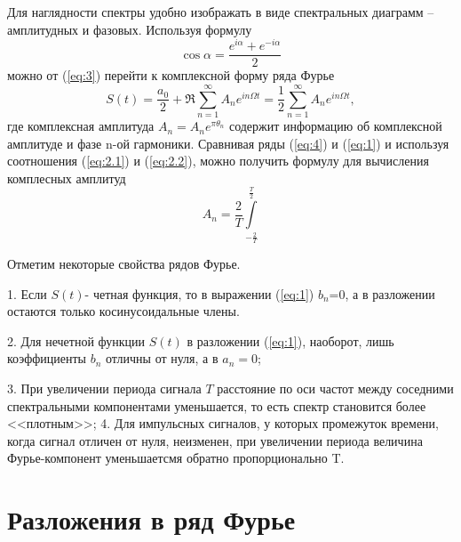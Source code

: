  Для наглядности спектры удобно изображать в виде спектральных диаграмм -- амплитудных и фазовых.
 Используя формулу
 \begin{equation}
 	\cos\alpha=\frac{e^{i\alpha}+e^{-i\alpha}}{2}
 \end{equation}
 можно от (\ref{eq:3}) перейти к комплексной форму ряда Фурье
 \begin{equation}
 	\label{eq:4}
 	S(t)=\frac{a_0}{2}+\Re\sum_{n=1}^{\infty}A_ne^{in\Omega t}=\frac{1}{2}\sum_{n=1}^{\infty}A_ne^{in\Omega t}, %
 \end{equation}
 где комплексная амплитуда $A_n=A_ne^{\pi\theta_n}$ содержит информацию об комплексной амплитуде и фазе n-ой гармоники. Сравнивая ряды (\ref{eq:4}) и (\ref{eq:1}) и используя соотношения (\ref{eq:2.1}) и (\ref{eq:2.2}), можно получить формулу для вычисления комплесных амплитуд
 \begin{equation}
 	A_n=\frac{2}{T}\int\limits_{-\frac{2}{T}}^{\frac{T}{2}}
 \end{equation}

 Отметим некоторые свойства рядов Фурье.

 1. Если $S(t)$- четная функция, то в выражении (\ref{eq:1}) $b_n$=0, а в разложении остаются только косинусоидальные члены.

 2. Для нечетной функции $S(t)$ в разложении (\ref{eq:1}), наоборот, лишь коэффициенты $b_n$ отличны от нуля, а в $a_n=0$;

 3. При увеличении периода сигнала $T$ расстояние по оси частот между соседними спектральными компонентами уменьшается, то есть спектр становится более <<плотным>>;
 4. Для импульсных сигналов, у которых промежуток времени, когда сигнал отличен от нуля, неизменен, при увеличении периода величина Фурье-компонент уменьшаетсмя обратно пропорционально T.
\section{Разложения в ряд Фурье}
